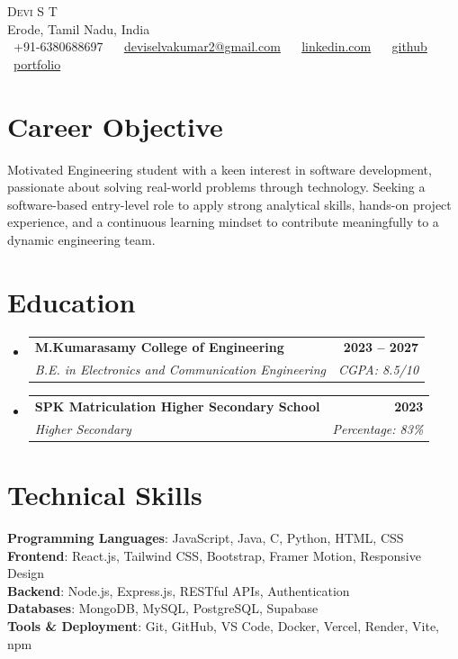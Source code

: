 \documentclass[letterpaper,11pt]{article}
\makeatletter
\newcommand{\resumeSubheading}[4]{
  \vspace{-2pt}\item
  \begin{tabular*}{1.0\textwidth}[t]{l@{\extracolsep{\fill}}r}
    \textbf{#1} & \textbf{\small #2} \\
    \textit{\small#3} & \textit{\small #4} \\
  \end{tabular*}\vspace{-7pt}
}
\newcommand{\resumeSubHeadingListStart}{\begin{itemize}[leftmargin=0.0in, label={}]}
\newcommand{\resumeSubHeadingListEnd}{\end{itemize}}
\makeatother
\begin{document}
\begin{center}
    {\Huge \scshape Devi S T} \\ \vspace{1pt}
    Erode, Tamil Nadu, India \\ \vspace{1pt}
    \small
    \faPhone\ +91-6380688697 ~
    \faEnvelope\ \href{mailto:deviselvakumar2@gmail.com}{deviselvakumar2@gmail.com} ~
    \faLinkedin\ \href{https://www.linkedin.com/in/devi-selvakumar}{linkedin.com} ~
    \faGithub\ \href{https://github.com/Git-by-Devi}{github}
    \faGlobe\ \href{https://personal-portfolio-sand-six-18.vercel.app/}{portfolio}
    \vspace{-8pt}
\end{center}

\section{Career Objective}
\small{
Motivated Engineering student with a keen interest in software development, passionate about solving real-world problems through technology. Seeking a software-based entry-level role to apply strong analytical skills, hands-on project experience, and a continuous learning mindset to contribute meaningfully to a dynamic engineering team.
}

\section{Education}
\resumeSubHeadingListStart
  \resumeSubheading
    {M.Kumarasamy College of Engineering}{2023 -- 2027}
    {B.E. in Electronics and Communication Engineering}{CGPA: 8.5/10}
  \resumeSubheading
    {SPK Matriculation Higher Secondary School}{2023}
    {Higher Secondary}{Percentage: 83\%}
\resumeSubHeadingListEnd

\section{Technical Skills}
\begin{itemize}[leftmargin=0.15in, label={}]
  \small{\item{
    \textbf{Programming Languages}{: JavaScript, Java, C, Python, HTML, CSS} \\
    \textbf{Frontend}{: React.js, Tailwind CSS, Bootstrap, Framer Motion, Responsive Design} \\
    \textbf{Backend}{: Node.js, Express.js, RESTful APIs, Authentication} \\
    \textbf{Databases}{: MongoDB, MySQL, PostgreSQL, Supabase} \\
    \textbf{Tools \& Deployment}{: Git, GitHub, VS Code, Docker, Vercel, Render, Vite, npm} \\
  }}
\end{itemize}
\end{document}
